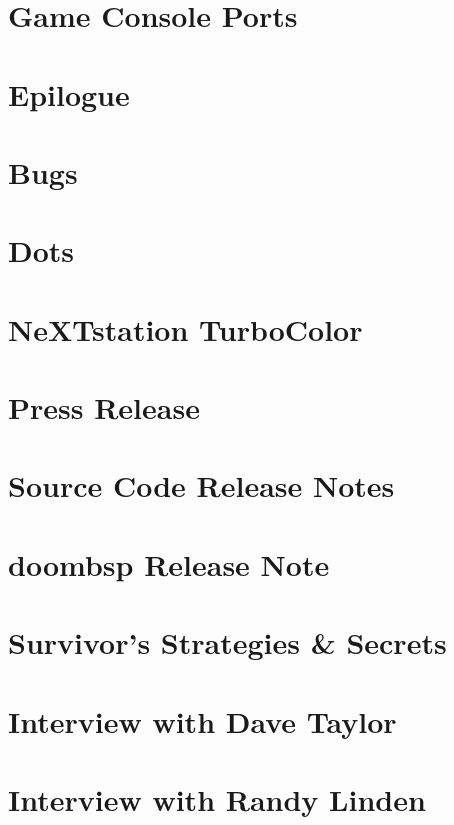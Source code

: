 \documentclass{book}
\begin{document}
    \chapter{Game Console Ports}        
          

    \chapter*{Epilogue}
      

    \appendix
    \appendixpage
      \chapter{Bugs}
      
    \chapter{Dots}  
      


    \chapter{NeXTstation TurboColor}
    
    
      \chapter{Press Release}
      
      \chapter{Source Code Release Notes}
      
      \chapter{doombsp Release Note}
      
      \chapter{Survivor's Strategies \& Secrets}
      
   
      \chapter{Interview with Dave Taylor}
      
      \chapter{Interview with Randy Linden}
            
\end{document}
